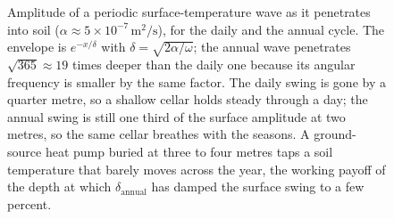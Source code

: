 \begin{figure}[htbp]
\centering
{}
\caption[Thermal wave penetration into the ground]{Amplitude of a
periodic surface-temperature wave as it penetrates into soil
($\alpha \approx 5\times 10^{-7}\,\si{\meter\squared\per\second}$),
for the daily and the annual cycle. The envelope is $e^{-x/\delta}$
with $\delta = \sqrt{2\alpha/\omega}$; the annual wave penetrates
$\sqrt{365} \approx 19$ times deeper than the daily one because its
angular frequency is smaller by the same factor. The daily swing is
gone by a quarter metre, so a shallow cellar holds steady through a
day; the annual swing is still one third of the surface amplitude at
two metres, so the same cellar breathes with the seasons. A
ground-source heat pump buried at three to four metres taps a soil
temperature that barely moves across the year, the working payoff of
the depth at which $\delta_{\text{annual}}$ has damped the surface
swing to a few percent.}
\label{fig:vol02:ch12:ground-wave}
\end{figure}
